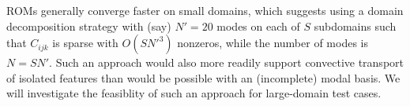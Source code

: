 ROMs generally converge faster on small domains, which suggests using
a domain decomposition strategy with (say) $N'=20$ modes on each of $S$
subdomains such that $C_{ijk}$ is sparse with $O(SN'^3)$ nonzeros,
while the number of modes is $N=SN'$.  Such an approach would also
more readily support convective transport of isolated features than
would be possible with an (incomplete) modal basis.  We will investigate
the feasiblity of such an approach for large-domain test cases.






